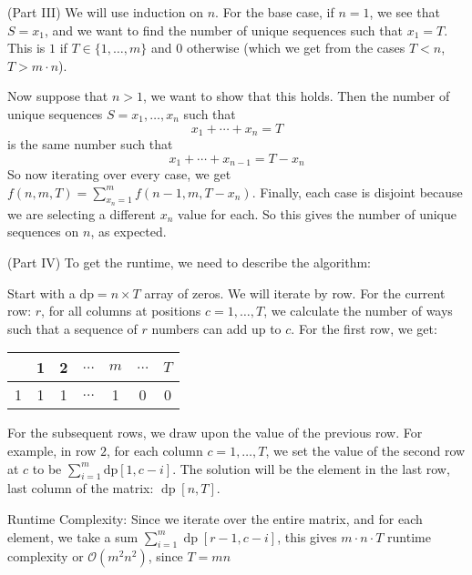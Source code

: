 \documentclass{article}
\begin{document}
\begin{itemize}
\begin{answer}
                (Part III) We will use induction on $n$. For the base case, if $n = 1$, we see that $S = x_{1}$, and we want to find the number of unique sequences such that $x_{1} = T$. This is $1$ if $T \in \{1, \ldots, m\}$ and $0$ otherwise (which we get from the cases $T < n$, $T > m \cdot n$). 

                Now suppose that $n > 1$, we want to show that this holds. Then the number of unique sequences $S = x_{1}, \ldots, x_{n}$ such that 
                    \begin{equation*}
                        x_{1} + \cdots + x_{n} = T
                    \end{equation*}
                is the same number such that
                    \begin{equation*}
                        x_{1} + \cdots + x_{n - 1} = T - x_{n}
                    \end{equation*}
                So now iterating over every case, we get $f(n, m, T) = \sum_{x_{n} = 1}^{m} f(n - 1, m, T - x_{n})$. Finally, each case is disjoint because we are selecting a different $x_{n}$ value for each. So this gives the number of unique sequences on $n$, as expected.

                (Part IV) To get the runtime, we need to describe the algorithm:

                Start with a $\text{dp} = n \times T$ array of zeros. We will iterate by row. For the current row: $r$, for all columns at positions $c = 1, \ldots, T$, we calculate the number of ways such that a sequence of $r$ numbers can add up to $c$. For the first row, we get:
                    \begin{center}
                        \begin{tabular}{ c c c c c c c }
                            \hline   & 1 & 2 &  $\ldots$ &  $m$ &  $\ldots$ &  $T$ \\
                            \hline 1 & 1 & 1 &  $\ldots$ & 1    & 0         & 0      
                        \end{tabular}
                    \end{center}
                For the subsequent rows, we draw upon the value of the previous row. For example, in row $2$, for each column $c = 1, \ldots, T$, we set the value of the second row at $c$ to be $\sum_{i = 1}^{m} \text{dp}[1, c - i]$. The solution will be the element in the last row, last column of the matrix: $\mathop{dp}[n, T]$.

                Runtime Complexity: Since we iterate over the entire matrix, and for each element, we take a sum $\sum_{i = 1}^{m}\mathop{dp}[r - 1, c - i]$, this gives $m \cdot n \cdot T$ runtime complexity or $\mathcal{O}(m^{2}n^{2})$, since $T = mn$


\end{answer}
\end{itemize}
\end{document}
